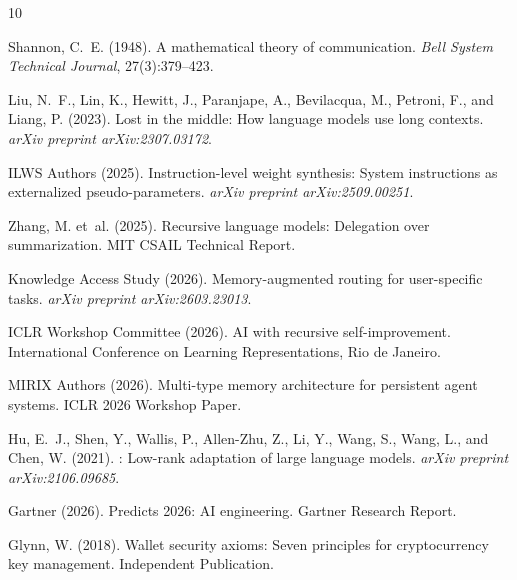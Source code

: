 \documentclass[11pt, a4paper]{article}
\begin{document}

\begin{thebibliography}{10}

Shannon, C.~E. (1948).
\newblock A mathematical theory of communication.
\newblock \emph{Bell System Technical Journal}, 27(3):379--423.

Liu, N.~F., Lin, K., Hewitt, J., Paranjape, A., Bevilacqua, M., Petroni, F., and Liang, P. (2023).
\newblock Lost in the middle: How language models use long contexts.
\newblock \emph{arXiv preprint arXiv:2307.03172}.

{ILWS Authors} (2025).
\newblock Instruction-level weight synthesis: System instructions as externalized pseudo-parameters.
\newblock \emph{arXiv preprint arXiv:2509.00251}.

Zhang, M. et~al. (2025).
\newblock Recursive language models: Delegation over summarization.
\newblock MIT CSAIL Technical Report.

{Knowledge Access Study} (2026).
\newblock Memory-augmented routing for user-specific tasks.
\newblock \emph{arXiv preprint arXiv:2603.23013}.

{ICLR Workshop Committee} (2026).
\newblock AI with recursive self-improvement.
\newblock International Conference on Learning Representations, Rio de Janeiro.

{MIRIX Authors} (2026).
\newblock Multi-type memory architecture for persistent agent systems.
\newblock ICLR 2026 Workshop Paper.

Hu, E.~J., Shen, Y., Wallis, P., Allen-Zhu, Z., Li, Y., Wang, S., Wang, L., and Chen, W. (2021).
: Low-rank adaptation of large language models.
\newblock \emph{arXiv preprint arXiv:2106.09685}.

{Gartner} (2026).
\newblock Predicts 2026: {AI} engineering.
\newblock Gartner Research Report.

Glynn, W. (2018).
\newblock Wallet security axioms: Seven principles for cryptocurrency key management.
\newblock Independent Publication.

\end{thebibliography}
\end{document}
